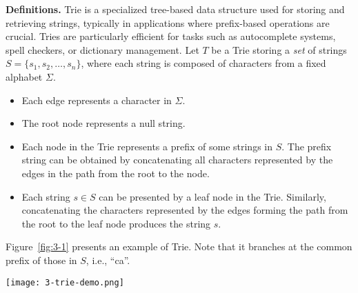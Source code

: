 \begin{tcolorbox}[colframe = blue, title={Reference Reading}, colback = white, enhanced, breakable, 
    skin first=enhanced,
    skin middle=enhanced,
    skin last=enhanced,
    before upper={\parindent15pt}]

\textbf{Definitions.}
Trie is a specialized tree-based data structure used for storing and retrieving strings, typically in applications where prefix-based operations are crucial. Tries are particularly efficient for tasks such as autocomplete systems, spell checkers, or dictionary management. Let $T$ be a Trie storing a \textit{set} of strings $S = \{s_1, s_2, \ldots, s_n\}$, where each string is composed of characters from a fixed alphabet $\Sigma$. 
\begin{itemize}
    \item Each edge represents a character in $\Sigma$.
    \item The root node represents a null string.
    \item Each node in the Trie represents a prefix of some strings in $S$. The prefix string can be obtained by concatenating all characters represented by the edges in the path from the root to the node.
    \item Each string $s \in S$ can be presented by a leaf node in the Trie. Similarly, concatenating the characters represented by the edges forming the path from the root to the leaf node produces the string $s$.
    
\end{itemize}

Figure~\ref{fig:3-1} presents an example of Trie. Note that it branches at the common prefix of those in $S$, i.e., ``ca''.

    \begin{center}
    \texttt{[image: 3-trie-demo.png]}
    \label{fig:3-1}
    \end{center}


\end{tcolorbox}

